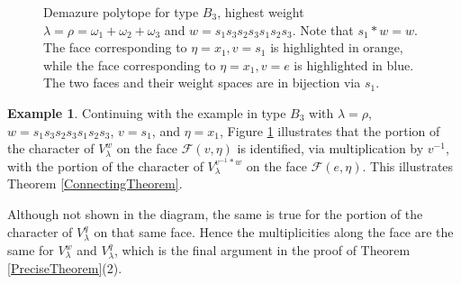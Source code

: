\documentclass[12pt,reqno]{amsart}
\theoremstyle{definition}
\newtheorem{example}{Example}
\begin{document}
\begin{figure}
\begin{center}
\caption{\label{example-figure-2} Demazure polytope for type $B_3$, highest weight $\lambda = \rho = \omega_1+\omega_2+\omega_3$ and $w =  s_1s_3s_2s_3s_1s_2s_3$. Note that $s_1*w = w$. The face corresponding to $\eta = x_1, v = s_1$ is highlighted in orange, while the face corresponding to $\eta = x_1, v = e$ is highlighted in blue. The two faces and their weight spaces are in bijection via $s_1$.  }
\end{center}
\end{figure}


\begin{example}
Continuing with the example in type $B_3$ with $\lambda = \rho$, $w = s_1s_3s_2s_3s_1s_2s_3$, $v = s_1$, and $\eta = x_1$, Figure \ref{example-figure-2} illustrates that the portion of the character of $V_\lambda^w$ on the face $\mathcal{F}(v,\eta)$ is identified, via multiplication by $v^{-1}$, with the portion of the character of $V_\lambda^{v^{-1}*w}$ on the face $\mathcal{F}(e,\eta)$. This illustrates Theorem \ref{ConnectingTheorem}. 

Although not shown in the diagram, the same is true for the portion of the character of $V_\lambda^q$ on that same face. Hence the multiplicities along the face are the same for $V_\lambda^w$ and $V_\lambda^q$, which is the final argument in the proof of Theorem \ref{PreciseTheorem}(2). 
\end{example}
\end{document}
